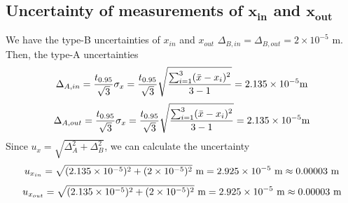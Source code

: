 \documentclass[a4paper]{report}
\begin{document}
	\subsection{Uncertainty of measurements of $\bm{x_{in}}$ and $\bm{x_{out}}$}
	We have the type-B uncertainties of $x_{in}$ and $x_{out}$ $\Delta_{B,in}=\Delta_{B,out}=2\times10^{-5}$ m. Then, the type-A uncertainties
	\begin{equation*}
	\Delta_{A,in}=\dfrac{t_{0.95}}{\sqrt{3}}\sigma_x=\dfrac{t_{0.95}}{\sqrt{3}}\sqrt{\dfrac{\sum_{i=1}^3(\bar{x}-x_i)^2}{3-1}}=2.135\times10^{-5}\rm{m}
	\end{equation*}
	\begin{equation*}
	\Delta_{A,out}=\dfrac{t_{0.95}}{\sqrt{3}}\sigma_x=\dfrac{t_{0.95}}{\sqrt{3}}\sqrt{\dfrac{\sum_{i=1}^3(\bar{x}-x_i)^2}{3-1}}=2.135\times10^{-5}\rm{m}
	\end{equation*}
	Since $u_{x}=\sqrt{\Delta_A^2+\Delta_B^2}$, we can calculate the uncertainty
	\begin{equation*}
	u_{x_{in}}=\sqrt{(2.135\times10^{-5})^2+(2\times10^{-5})^2}\ \rm{m}=2.925\times10^{-5}\ \rm{m}\approx{0.00003}\ \rm{m}
	\end{equation*}
	\begin{equation*}
	u_{x_{out}}=\sqrt{(2.135\times10^{-5})^2+(2\times10^{-5})^2}\ \rm{m}=2.925\times10^{-5}\ \rm{m}\approx{0.00003}\ \rm{m}
	\end{equation*}
\end{document}
